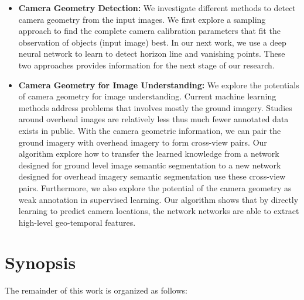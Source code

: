 \begin{itemize}[noitemsep]

  \item \textbf{Camera Geometry Detection:} 
  We investigate different methods to detect camera geometry from the
  input images. We first explore a sampling approach to find the
  complete camera calibration parameters that fit the observation of
  objects (input image) best. In our next work, we use a deep neural
  network to learn to detect horizon line and vanishing points. These
  two approaches provides information for the next stage of our
  research.

  \item \textbf{Camera Geometry for Image Understanding:}
  We explore the potentials of camera geometry for image understanding.
  Current machine learning methods address problems that involves mostly
  the ground imagery. 
  Studies around overhead images are relatively less thus much fewer
  annotated data exists in public. With the camera geometric
  information, we can pair the ground imagery with overhead imagery to
  form cross-view pairs. Our algorithm explore how to transfer the
  learned knowledge from a network designed for ground level image
  semantic segmentation to a new network designed for overhead imagery
  semantic segmentation use these cross-view pairs.
  Furthermore, we also explore the potential of the camera geometry as
  weak annotation in supervised learning. Our algorithm shows that by
  directly learning to predict camera locations, the network networks
  are able to extract high-level geo-temporal features.

\end{itemize}


\section{Synopsis}

The remainder of this work is organized as follows:
  
